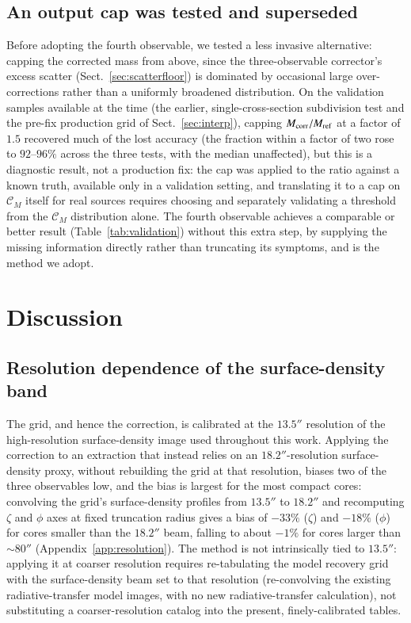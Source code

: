 \documentclass{aa}
\newcommand{\CM}{\mathcal{C}_{M}}
\newcommand{\Mref}{M_{\rm ref}}
\newcommand{\Mcorr}{M_{\rm corr}}
\begin{document}
\subsection{An output cap was tested and superseded}
\label{sec:outputcap}

Before adopting the fourth observable, we tested a less invasive
alternative: capping the corrected mass from above, since the
three-observable corrector's excess scatter (Sect.~\ref{sec:scatterfloor})
is dominated by occasional large over-corrections rather than a uniformly
broadened distribution. On the validation samples available at the time
(the earlier, single-cross-section subdivision test and the pre-fix
production grid of Sect.~\ref{sec:interp}), capping
$\Mcorr/\Mref$ at a factor of $1.5$ recovered much of the
lost accuracy (the fraction within a factor of two rose to
$92$--$96\%$ across the three tests, with the median unaffected), but this
is a diagnostic result, not a production fix: the cap was applied to the
ratio against a known truth, available only in a validation setting, and
translating it to a cap on $\CM$ itself for real sources requires choosing
and separately validating a threshold from the $\CM$ distribution alone.
The fourth observable achieves a comparable or
better result (Table~\ref{tab:validation}) without this extra step, by
supplying the missing information directly rather than truncating its
symptoms, and is the method we adopt.

\section{Discussion}
\label{sec:discussion}

\subsection{Resolution dependence of the surface-density band}
\label{sec:resolution}

The grid, and hence the correction, is calibrated at the $13.5''$
resolution of the high-resolution surface-density image used throughout
this work. Applying the correction to an extraction that instead relies on
an $18.2''$-resolution surface-density proxy, without rebuilding the grid at
that resolution, biases two of the three observables low, and the bias is
largest for the most compact cores: convolving the grid's surface-density
profiles from $13.5''$ to $18.2''$ and recomputing $\zeta$ and
$\phi$ axes at fixed truncation radius gives a bias of $-33\%$
($\zeta$) and $-18\%$ ($\phi$) for cores smaller than the
$18.2''$ beam, falling to about $-1\%$ for cores larger than $\sim\!80''$
(Appendix~\ref{app:resolution}). The method is not intrinsically tied to
$13.5''$: applying it at coarser resolution requires re-tabulating the
model recovery grid with the surface-density beam set to that resolution
(re-convolving the existing radiative-transfer model images, with no new radiative-transfer
calculation), not substituting a coarser-resolution catalog into the
present, finely-calibrated tables.
\end{document}
